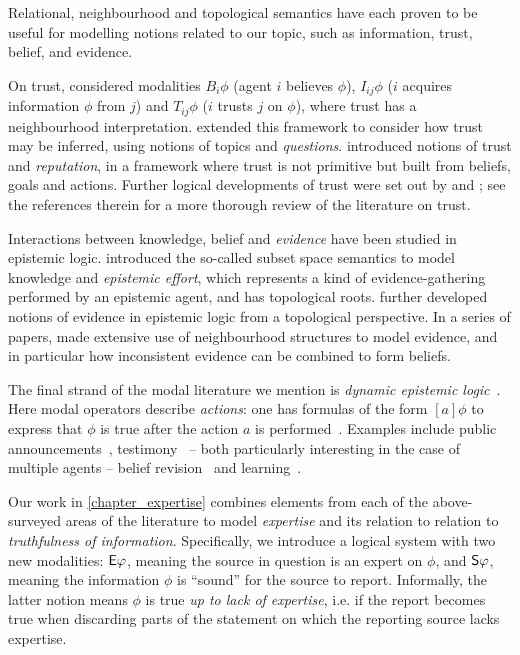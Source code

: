 {

Relational, neighbourhood and topological semantics have each proven to be
useful for modelling notions related to our topic, such as information, trust,
belief, and evidence.

On trust, \textcite{Liau_2003} considered modalities $B_i\phi$ (agent $i$
believes $\phi$), $I_{ij}\phi$ ($i$ acquires information $\phi$ from $j$) and
$T_{ij}\phi$ ($i$ trusts $j$ on $\phi$), where trust has a neighbourhood
interpretation. \textcite{dastani2004inferring} extended this framework to
consider how trust may be inferred, using notions of topics and
\emph{questions}. \textcite{herzig2010logic} introduced notions of trust and
\emph{reputation}, in a framework where trust is not primitive but built from
beliefs, goals and actions. Further logical developments of trust were set out
by \textcite{rodenhauser2014matter} and \textcite{tagliaferri2019logical}; see
the references therein for a more thorough review of the literature on trust.

Interactions between knowledge, belief and \emph{evidence} have been studied in
epistemic logic. \textcite{moss1992topological} introduced the so-called subset
space semantics to model knowledge and \emph{epistemic effort}, which
represents a kind of evidence-gathering performed by an epistemic agent, and
has topological roots. \textcite{ozgun_evidence} further developed notions of
evidence in epistemic logic from a topological perspective. In a series of
papers, \textcite{van2011dynamic,van2012evidence,vanbenthem2014106} made
extensive use of neighbourhood structures to model evidence, and in particular
how inconsistent evidence can be combined to form beliefs.

The final strand of the modal literature we mention is \emph{dynamic epistemic
logic}~\cite{van_Ditmarsch_2008,sep_del}. Here modal operators describe
\emph{actions}: one has formulas of the form $[a]\phi$ to express that $\phi$
is true after the action $a$ is performed~\cite{sep_del}. Examples include
public announcements~\cite{plaza2007logics},
testimony~\cite{holliday2009dynamic} -- both particularly interesting in the
case of multiple agents -- belief revision~\cite{baltag2008qualitative} and
learning~\cite{gierasimczuk2009bridging,gierasimczuk2010knowing}.

Our work in \cref{chapter_expertise} combines elements from each of the
above-surveyed areas of the literature to model \emph{expertise} and its
relation to relation to \emph{truthfulness of information}. Specifically, we
introduce a logical system with two new modalities: $\E\phi$, meaning the
source in question is an expert on $\phi$, and $\S\phi$, meaning the
information $\phi$ is ``sound'' for the source to report. Informally, the
latter notion means $\phi$ is true \emph{up to lack of expertise}, i.e. if the
report becomes true when discarding parts of the statement on which the
reporting source lacks expertise.

}
